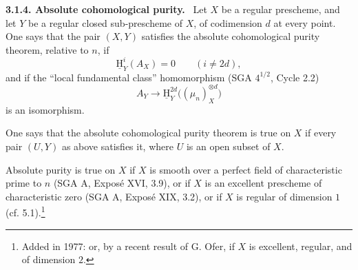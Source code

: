 \documentclass[11pt]{article}
\providecommand{\uH}{\underline{\mathrm H}}
\newenvironment{statement}[1]{\par\medskip\noindent\textbf{#1.}\ }{\par\medskip}
\begin{document}
\begin{statement}{3.1.4. Absolute cohomological purity}
Let $X$ be a regular prescheme, and let $Y$ be a regular closed sub-prescheme of $X$, of codimension $d$ at every point. One says that the pair $(X,Y)$ satisfies the absolute cohomological purity theorem, relative to $n$, if
\[
   \uH^i_Y(A_X)=0\qquad (i\ne 2d),
\]
and if the ``local fundamental class'' homomorphism (SGA $4^{1/2}$, Cycle 2.2)
\[
   A_Y\longrightarrow \uH^{2d}_Y\bigl((\mu_n)^{\otimes d}_X\bigr)
\]
is an isomorphism.

One says that the absolute cohomological purity theorem is true on $X$ if every pair $(U,Y)$ as above satisfies it, where $U$ is an open subset of $X$.

Absolute purity is true on $X$ if $X$ is smooth over a perfect field of characteristic prime to $n$ (SGA A, Exposé XVI, 3.9), or if $X$ is an excellent prescheme of characteristic zero (SGA A, Exposé XIX, 3.2), or if $X$ is regular of dimension $1$ (cf. 5.1).\footnote{Added in 1977: or, by a recent result of G. Ofer, if $X$ is excellent, regular, and of dimension $2$.}
\end{statement}
\end{document}
